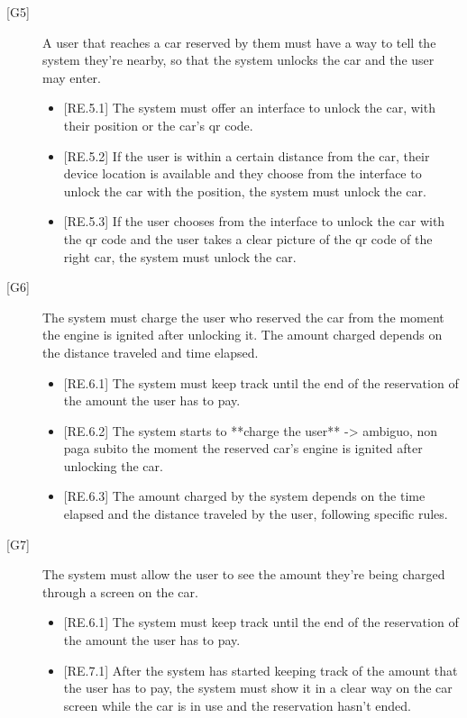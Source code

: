 \documentclass[english]{article}
\begin{document}
\begin{description}
\item[{[G5]}]{A user that reaches a car reserved by them must have a way to tell the system they’re nearby, so that the system unlocks the car and the user may enter.
\begin{itemize}
	\item{[RE.5.1] The system must offer an interface to unlock the car, with their position or the car's qr code.}
	\item{[RE.5.2] If the user is within a certain distance from the car, their device location is available and they choose from the interface to unlock the car with the position, the system must unlock the car.}
	\item{[RE.5.3] If the user chooses from the interface to unlock the car with the qr code and the user takes a clear picture of the qr code of the right car, the system must unlock the car.}
\end{itemize}
}

\item[{[G6]}]{The system must charge the user who reserved the car from the moment the engine is ignited after unlocking it. The amount charged depends on the distance traveled and time elapsed.
\begin{itemize}
	\item{[RE.6.1] The system must keep track until the end of the reservation of the amount the user has to pay.}
	\item{[RE.6.2] The system starts to **charge the user** -> ambiguo, non paga subito  the moment the reserved car’s engine is ignited after unlocking the car.}
	\item{[RE.6.3] The amount charged by the system depends on the time elapsed and the distance traveled by the user, following specific rules.}
\end{itemize}
}

\item[{[G7]}]{The system must allow the user to see the amount they’re being charged through a screen on the car.
\begin{itemize}
	\item{[RE.6.1] The system must keep track until the end of the reservation of the amount the user has to pay.}
	\item{[RE.7.1] After the system has started keeping track of the amount that the user has to pay, the system must show it in a clear way on the car screen while the car is in use and the reservation hasn’t ended.}
\end{itemize}
}


\end{description}
\end{document}
